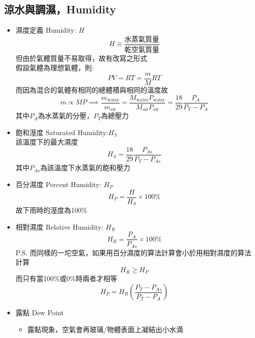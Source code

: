 \documentclass[../main.tex]{subfiles}
\begin{document}
\subsection{涼水與調濕，Humidity}
\begin{itemize}
  \item 濕度定義 Humidity: $H$
  \begin{equation}
    H \equiv \frac{\text{水蒸氣質量}}{\text{乾空氣質量}} 
  \end{equation}
  但由於氣體質量不易取得，故有改寫之形式\\
  假設氣體為理想氣體，則:
  \begin{equation}
    PV = RT = \frac{m}{M}RT
  \end{equation}
  而因為混合的氣體有相同的總體積與相同的溫度故
  \begin{equation}
    m\propto MP \implies \frac{m_{\text{water}}}{m_{\text{air}}} = 
    \frac{M_{\text{water}}P_{\text{water}}}{M_{\text{air}}P_{\text{air}}} = 
    \frac{18}{29}\frac{P_A}{P_T-P_{A}}
  \end{equation}
  其中$P_A$為水蒸氣的分壓，$P_T$為總壓力
  \item 飽和溼度 Saturated Humidity:$H_S$\\
  該溫度下的最大濕度
  \begin{equation}
    H_S = \frac{18}{29}\frac{P_{As}}{P_T-P_{As}}
  \end{equation}
  其中$P_{As}$為該溫度下水蒸氣的飽和壓力
  \item 百分濕度 Percent Humidity: $H_P$
  \begin{equation}
    H_P = \frac{H}{H_S}\times 100\%
  \end{equation}
  故下雨時的溼度為100\%
  \item 相對濕度 Relative Humidity: $H_R$
  \begin{equation}
    H_R = \frac{P_{A}}{P_{As}}\times 100\%
  \end{equation}
  P.S. 而同樣的一坨空氣，如果用百分濕度的算法計算會小於用相對濕度的算法計算
  \begin{equation}
    H_R \geq H_P
  \end{equation}
  而只有當100\%或0\%時兩者才相等
  \begin{equation}
    H_P = H_R\left(
    \frac{P_T - P_{As}}{P_T - P_{A}}
    \right)
  \end{equation}
  \item 露點 Dew Point
  \begin{itemize}
    \item 露點現象，空氣會再玻璃/物體表面上凝結出小水滴

\end{itemize}
\end{itemize}
\end{document}
